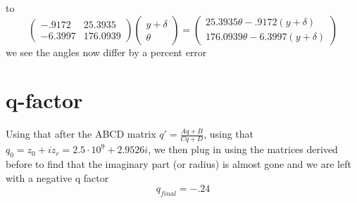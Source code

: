 \documentclass[11pt]{amsart}
\makeatletter
\newcommand{\0}{\varnothing}		%
\newcommand{\ti}{\cdot}			%
\newcommand{\1}{!}
\newcommand{\2}{@}
\newcommand{\3}{\#}
\newcommand{\4}{\$}
\newcommand{\5}{\%}
\newcommand{\6}{$^\wedge$}
\newcommand{\7}{\&}
\newcommand{\8}{*}
\newcommand{\9}{(}
\makeatother
\begin{document}
to 
\[
\begin{pmatrix}
-.9172	&	25.3935
\\
-6.3997	&	176.0939
\end{pmatrix}
\begin{pmatrix}
y+\delta \\ \theta
\end{pmatrix} =\begin{pmatrix}25.3935\theta -.9172 (y+\delta)\\ 176.0939 \theta -6.3997 (y+\delta)\end{pmatrix}
\]
we see the angles now differ by a percent error

\section{q-factor}
Using that after the ABCD matrix $q' = \frac{Aq+B}{Cq+D}$, using that $q_0 = z_0+iz_r = 2.5\ti 10^9 + 2.9526 i$, we then plug in using the matrices derived before to find that the imaginary part (or radius) is almost gone and we are left with a negative q factor 
\[
q_{final} = -.24
\]
\end{document}
